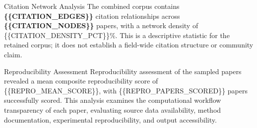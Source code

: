 \documentclass[
  ignorenonframetext,
]{beamer}
\begin{document}
\begin{frame}[allowframebreaks]{Citation Network Analysis}
\label{citation-network-analysis}
The combined corpus contains \textbf{\{\{CITATION\_EDGES\}\}} citation
relationships across \textbf{\{\{CITATION\_NODES\}\}} papers, with a
network density of \{\{CITATION\_DENSITY\_PCT\}\}\%. This is a
descriptive statistic for the retained corpus; it does not establish a
field-wide citation structure or community claim.
\end{frame}

\begin{frame}[allowframebreaks]{Reproducibility Assessment}
\label{reproducibility-assessment}
Reproducibility assessment of the sampled papers revealed a mean
composite reproducibility score of \{\{REPRO\_MEAN\_SCORE\}\}, with
\{\{REPRO\_PAPERS\_SCORED\}\} papers successfully scored. This analysis
examines the computational workflow transparency of each paper,
evaluating source data availability, method documentation, experimental
reproducibility, and output accessibility.
\end{frame}
\end{document}

